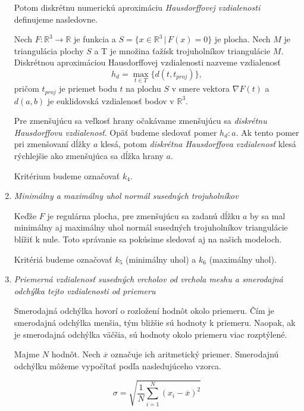 \begin{enumerate}
{    Potom diskrétnu numerickú aproximáciu \textit{Hausdorffovej vzdialenosti} definujeme nasledovne.
    \begin{definition}
        Nech $F:\mathbb{R}^3 \to \mathbb{R}$ je funkcia a $S = \{x \in \mathbb{R}^3 \, | \, F(x)=0 \}$ 
        je plocha. Nech $M$ je triangulácia plochy $S$
        a T je množina ťažísk trojuholníkov triangulácie $M$.
        Diskrétnou aproximáciou Hausdorffovej vzdialenosti nazveme vzdialenosť
        \begin{equation}
            h_d = \max_{t \in T} \big \{ d(t, t_{proj})\big \},
        \end{equation}
        pričom $t_{proj}$ je priemet bodu $t$ na plochu $S$ v smere vektora $\nabla F(t)$ a
        $d(a, b)$ je euklidovská vzdialenosť bodov v $\mathbb{R}^3$.
    \end{definition}

    Pre zmenšujúcu sa veľkosť hrany očakávame zmenšujúcu sa \textit{diskrétnu Hausdorffovu vzdialenosť}.
    Opäť budeme sledovať pomer $h_d : a$. Ak tento pomer pri zmenšovaní dĺžky $a$ klesá, potom 
    \textit{diskrétna Hausdorffova vzdialenosť} klesá rýchlejšie ako zmenšujúca sa dĺžka hrany $a$.

    Kritérium budeme označovať $k_4$.
}
\item{
    \textit{Minimálny a maximálny uhol normál susedných trojuholníkov}

    Keďže $F$ je regulárna plocha, pre zmenšujúcu sa zadanú dĺžku $a$ by sa mal minimálny aj maximálny 
    uhol normál susedných trojuholníkov triangulácie blížiť k nule. Toto správanie sa pokúsime sledovať aj na našich modeloch.

    Kritériá budeme označovať $k_5$ (minimálny uhol) a $k_6$ (maximálny uhol).
}
\item{
    \textit{Priemerná vzdialenosť susedných vrcholov od vrchola meshu a smerodajná odchýlka tejto vzdialenosti od priemeru}

    Smerodajná odchýlka hovorí o rozložení hodnôt okolo priemeru. Čím je smerodajná odchýlka menšia, 
    tým bližšie sú hodnoty k priemeru. Naopak, ak je smerodajná odchýlka väčšia, sú hodnoty okolo
    priemeru viac rozptýlené.
    
    Majme $N$ hodnôt. Nech $\overline{x}$ označuje ich aritmetický priemer. 
    Smerodajnú odchýlku môžeme vypočítať podľa nasledujúceho vzorca.

    \begin{equation}
    \label{eq:std}
    \sigma = \sqrt{\frac{1}{N} \sum\limits_{i=1}^{N}(x_i - \overline{x})^2} 
    \end{equation}

}
\end{enumerate}
